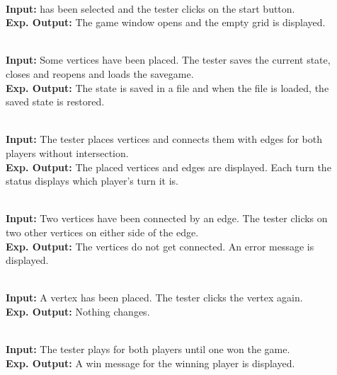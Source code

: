 \begin{description}
	\item[] \textbf{} \\
	\textbf{Input:} \twixt has been selected and the tester clicks on the start button. \\
	\textbf{Exp. Output:} The game window opens and the empty grid is displayed.
	
	\item[] \textbf{} \\
	\textbf{Input:} Some vertices have been placed. The tester saves the current state, closes and reopens \twixt and loads the savegame. \\
	\textbf{Exp. Output:} The state is saved in a file and when the file is loaded, the saved state is restored.
	
	\item[] \textbf{} \\
	\textbf{Input:} The tester places vertices and connects them with edges for both players without intersection. \\
	\textbf{Exp. Output:} The placed vertices and edges are displayed. Each turn the status displays which player's turn it is.
	
	\item[] \textbf{} \\
	\textbf{Input:} Two vertices have been connected by an edge. The tester clicks on two other vertices on either side of the edge. \\
	\textbf{Exp. Output:} The vertices do not get connected. An error message is displayed.
	
	\item[] \textbf{} \\
	\textbf{Input:} A vertex has been placed. The tester clicks the vertex again. \\
	\textbf{Exp. Output:} Nothing changes.
	
	\item[] \textbf{} \\
	\textbf{Input:} The tester plays for both players until one won the game. \\
	\textbf{Exp. Output:} A win message for the winning player is displayed.
\end{description}

